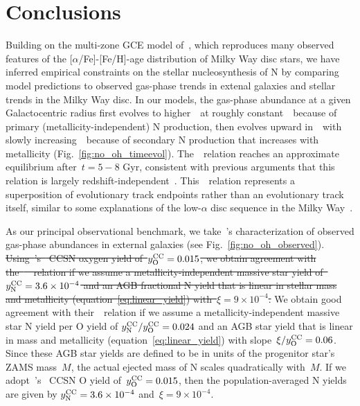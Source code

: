 \documentclass[ms.tex]{subfiles}
\begin{document}
\section{Conclusions}
\label{sec:conclusions}

Building on the multi-zone GCE model of~\citet{Johnson2021}, which reproduces
many observed features of the [$\alpha$/Fe]-[Fe/H]-age distribution of Milky
Way disc stars, we have inferred empirical constraints on the stellar
nucleosynthesis of N by comparing model predictions to observed gas-phase trends
in extenal galaxies and stellar trends in the Milky Way disc.
In our models, the gas-phase abundance at a given Galactocentric radius first
evolves to higher~\oh~at roughly constant~\no~because of primary
(metallicity-independent) N production, then evolves upward in~\no~with slowly
increasing~\oh~because of secondary N production that increases with
metallicity (Fig.~\ref{fig:no_oh_timeevol}).
The~\ohno~relation reaches an approximate equilibrium after~$t = 5 - 8$ Gyr,
consistent with previous arguments that this relation is largely
redshift-independent~\citep{Vincenzo2018, HaydenPawson2021}.
This~\ohno~relation represents a superposition of evolutionary track endpoints
rather than an evolutionary track itself, similar to some explanations of the
low-$\alpha$ disc sequence in the Milky Way~\citep[e.g.][]{Schoenrich2009,
Nidever2014, Buck2020, Sharma2021, Johnson2021}.
\par
As our principal observational benchmark, we take~\citeauthor{Dopita2016}'s
\citeyearpar{Dopita2016} characterization of observed gas-phase abundances
in external galaxies (see Fig.~\ref{fig:no_oh_observed}).
{\color{red}
\sout{
Using~\mbox{\citeauthor{Johnson2021}}'s~\mbox{\citeyearpar{Johnson2021}} CCSN
oxygen yield of~$y_\text{O}^\text{CC} = 0.015$, we obtain agreement with
the~\mbox{\citet{Dopita2016}}~\ohno~relation if we assume a
metallicity-independent
massive star yield of~$y_\text{N}^\text{CC} = 3.6\times10^{-4}$ and an AGB fractional N
yield that is linear in stellar mass and metallicity
(equation~\ref{eq:linear_yield}) with~$\xi = 9\times10^{-4}$.
}
We obtain good agreement with their~\ohno~relation if we assume a
metallicity-independent massive star N yield per O yield of
$y_\text{N}^\text{CC} / y_\text{O}^\text{CC} = 0.024$ and an AGB star yield that is linear in mass and
metallicity (equation~\ref{eq:linear_yield}) with slope~$\xi / y_\text{O}^\text{CC} = 0.06$.
Since these AGB star yields are defined to be in units of the progenitor star's
ZAMS mass~$M$, the actual ejected mass of N scales quadratically with~$M$.
If we adopt~\citeauthor{Johnson2021}'s~\citeyearpar{Johnson2021} CCSN O yield
of~$y_\text{O}^\text{CC} = 0.015$, then the population-averaged N yields are given by
$y_\text{N}^\text{CC} = 3.6\times10^{-4}$ and~$\xi = 9\times10^{-4}$.
}
\end{document}
